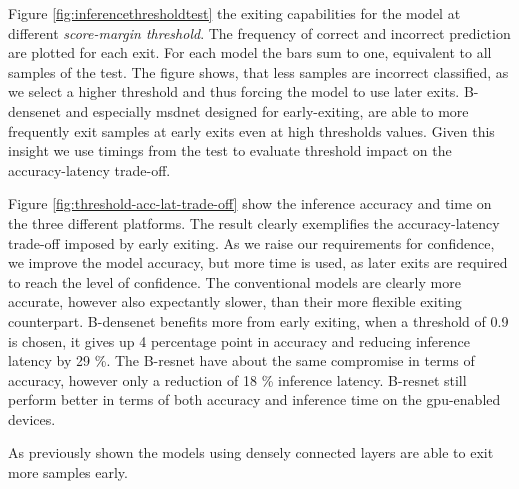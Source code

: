 Figure \ref{fig:inferencethresholdtest} the exiting capabilities for the model at different \emph{score-margin threshold}. The frequency of correct and incorrect prediction are plotted for each exit. For each model the bars sum to one, equivalent to all samples of the test. The figure shows, that less samples are incorrect classified, as we select a higher threshold and thus forcing the model to use later exits. B-\gls{densenet} and especially \gls{msdnet}  designed for early-exiting, are able to more frequently exit samples at early exits even at high thresholds values. Given this insight we use timings from the test to evaluate threshold impact on the accuracy-latency trade-off.


Figure \ref{fig:threshold-acc-lat-trade-off} show the inference accuracy and time on the three different platforms. The result clearly exemplifies the accuracy-latency trade-off imposed by early exiting. As we raise our requirements for confidence, we improve the model accuracy, but more time is used, as later exits are required to reach the level of confidence. The conventional models are clearly more accurate, however also expectantly slower, than their more flexible exiting counterpart. B-\gls{densenet} benefits more from early exiting, when a threshold of 0.9 is chosen, it gives up 4 percentage point in accuracy and reducing inference latency by 29 \%. The B-\gls{resnet} have about the same compromise in terms of accuracy, however only a reduction of 18 \% inference latency. B-\gls{resnet} still perform better in terms of both accuracy and inference time on the \gls{gpu}-enabled devices. 

As previously shown the models using densely connected layers are able to exit more samples early.

